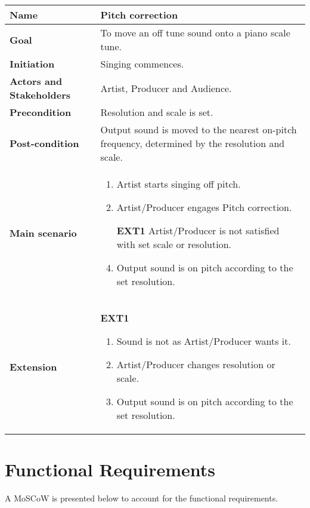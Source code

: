 \begin{table}[H]
	\centering
	\begin{tabularx}{\textwidth}{p{} X}
		\toprule
		\textbf{Name} & Pitch correction \\
		\midrule
		\textbf{Goal} & To move an off tune sound onto a piano scale tune. \\
		\midrule
		\textbf{Initiation} & Singing commences.\\
		\midrule
		\textbf{Actors and Stakeholders} & Artist, Producer and Audience. \\
		\midrule
		\textbf{Precondition} & Resolution and scale is set. \\
		\midrule
		\textbf{Post-condition} & Output sound is moved to the nearest on-pitch frequency, determined by the resolution and scale. \\
		\midrule
		\textbf{Main scenario} & 
		\begin{enumerate}[noitemsep, topsep=0pt]
			\item Artist starts singing off pitch.
			\item Artist/Producer engages Pitch correction.
			\item[\textbf{EXT1}] Artist/Producer is not satisfied with set scale or resolution.
			\item Output sound is on pitch according to the set resolution.
		\end{enumerate}
		\\
		\midrule
		\textbf{Extension} & 
		\textbf{EXT1}
		\begin{enumerate}[noitemsep, topsep=0pt]
			\item Sound is not as Artist/Producer wants it.
			\item Artist/Producer changes resolution or scale.
			\item Output sound is on pitch according to the set resolution.
		\end{enumerate}
		\\
		\bottomrule
	\end{tabularx}
\end{table}

\section{Functional Requirements}
A MoSCoW is presented below to account for the functional requirements.

